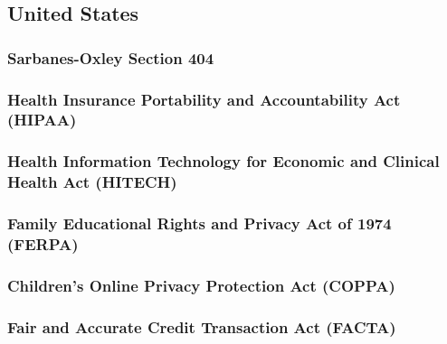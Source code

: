 \hypertarget{united-states}{%
\subsection{United States}\label{united-states}}

\hypertarget{sarbanes-oxley-section-404}{%
\subsubsection{Sarbanes-Oxley Section
404}\label{sarbanes-oxley-section-404}}

\hypertarget{health-insurance-portability-and-accountability-act-hipaa}{%
\subsubsection{Health Insurance Portability and Accountability Act
(HIPAA)}\label{health-insurance-portability-and-accountability-act-hipaa}}

\hypertarget{health-information-technology-for-economic-and-clinical-health-act-hitech}{%
\subsubsection{Health Information Technology for Economic and Clinical
Health Act
(HITECH)}\label{health-information-technology-for-economic-and-clinical-health-act-hitech}}

\hypertarget{family-educational-rights-and-privacy-act-of-1974-ferpa}{%
\subsubsection{Family Educational Rights and Privacy Act of 1974
(FERPA)}\label{family-educational-rights-and-privacy-act-of-1974-ferpa}}

\hypertarget{childrens-online-privacy-protection-act-coppa}{%
\subsubsection{Children's Online Privacy Protection Act
(COPPA)}\label{childrens-online-privacy-protection-act-coppa}}

\hypertarget{fair-and-accurate-credit-transaction-act-facta}{%
\subsubsection{Fair and Accurate Credit Transaction Act
(FACTA)}\label{fair-and-accurate-credit-transaction-act-facta}}


